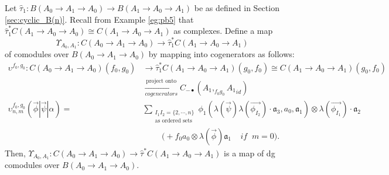 \begin{prop}
\label{prop:c1}
Let $\hat{\tau}_1: 
B(A_0 \to A_1 \to A_0) 
\longrightarrow B(A_1 \to A_0 \to A_1)$ 
be as defined in Section 
\ref{sec:cyclic_B(n)}.
Recall from Example \ref{eg:pb5} that 
$\hat{\tau}_1^*C(A_1 \to A_0 \to A_0)
\cong C(A_1 \to A_0 \to A_1)$ 
as complexes. Define a map 
$$
\Upsilon_{A_0,A_1}: C(A_0 \to A_1 \to A_0)
\to \hat{\tau}_1^*C(A_1 \to A_0 \to A_1)
$$
of comodules over 
$B(A_0 \to A_1 \to A_0)$ by mapping into 
cogenerators as follows:
\begin{align*}
\upsilon^{f_0, g_0}: C(A_0 \to A_1 \to A_0)(f_0,g_0) 
&\to
\hat{\tau}_1^*C(A_1 \to A_0 \to A_1)(g_0,f_0)
\cong 
C(A_1 \to A_0 \to A_1)(g_0,f_0)\\
&\xrightarrow[cogenerators]{\textrm{project onto}}
C_{-\bullet}(A_1, _{f_0g_0}{A_1}_{id})\\
\upsilon_{n,m}^{f_0,g_0} 
(\vec{\phi} | \vec{\psi} | \alpha) = 
& \sum_{\substack{I_1I_2 = \{2,\cdots,n\} \\
                          \textrm{as ordered sets}}}
  \phi_1(\lambda(\vec{\psi})\lambda(\vec{\phi_{I_2}})\cdot \mathfrak{a}_3, a_0, \mathfrak{a}_1) \otimes \lambda(\vec{\phi_{I_1}}) \cdot \mathfrak{a}_2 \\
&\phantom{{}move{}}
\bigg( + f_0a_0 \otimes \lambda(\vec{\phi}) \mathfrak{a}_1 
  \; \; \; \; if \; \; m = 0 \bigg).
\end{align*}
Then, $\Upsilon_{A_0,A_1}: C(A_0 \to A_1 \to A_0)
\to \hat{\tau}^*C(A_1 \to A_0 \to A_1)$ 
is a map of dg comodules over 
$B(A_0 \to A_1 \to A_0)$.
\end{prop}
%
